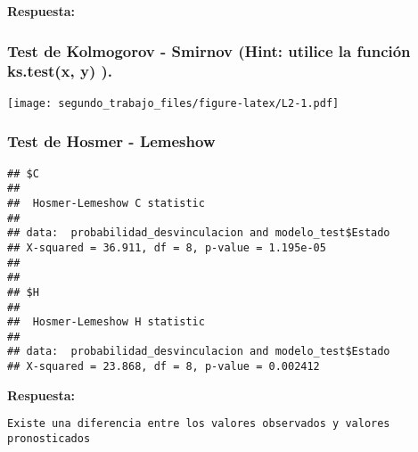 \documentclass[
]{article}
\newenvironment{Shaded}{\begin{snugshade}}{\end{snugshade}}
\newcommand{\AttributeTok}[1]{\textcolor[rgb]{0.77,0.63,0.00}{#1}}
\newcommand{\FunctionTok}[1]{\textcolor[rgb]{0.00,0.00,0.00}{#1}}
\newcommand{\NormalTok}[1]{#1}
\newcommand{\OtherTok}[1]{\textcolor[rgb]{0.56,0.35,0.01}{#1}}
\newcommand{\SpecialCharTok}[1]{\textcolor[rgb]{0.00,0.00,0.00}{#1}}
\begin{document}
\textbf{Respuesta:}

\hypertarget{test-de-kolmogorov---smirnov-hint-utilice-la-funciuxf3n-ks.testx-y-.}{%
\subsubsection{Test de Kolmogorov - Smirnov (Hint: utilice la función
ks.test(x, y)
).}\label{test-de-kolmogorov---smirnov-hint-utilice-la-funciuxf3n-ks.testx-y-.}}

\begin{Shaded}
\end{Shaded}

\texttt{[image: segundo\_trabajo\_files/figure-latex/L2-1.pdf]}

\hypertarget{test-de-hosmer---lemeshow}{%
\subsubsection{Test de Hosmer -
Lemeshow}\label{test-de-hosmer---lemeshow}}

\begin{Shaded}
\end{Shaded}

\begin{verbatim}
## $C
## 
##  Hosmer-Lemeshow C statistic
## 
## data:  probabilidad_desvinculacion and modelo_test$Estado
## X-squared = 36.911, df = 8, p-value = 1.195e-05
## 
## 
## $H
## 
##  Hosmer-Lemeshow H statistic
## 
## data:  probabilidad_desvinculacion and modelo_test$Estado
## X-squared = 23.868, df = 8, p-value = 0.002412
\end{verbatim}

\textbf{Respuesta:}

\begin{verbatim}
Existe una diferencia entre los valores observados y valores pronosticados
\end{verbatim}
\end{document}
